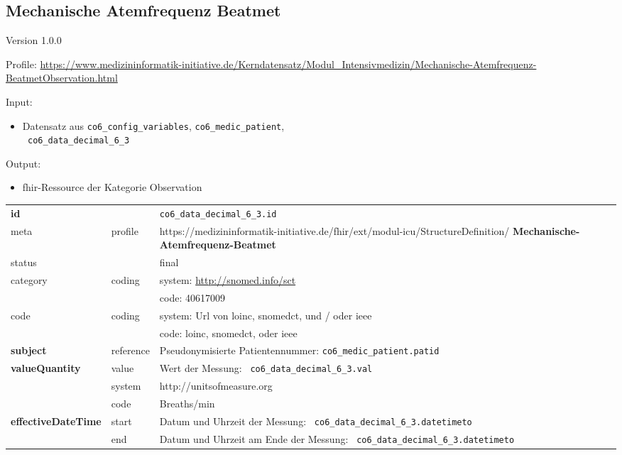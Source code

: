 \subsection{Mechanische Atemfrequenz Beatmet} 
\noindent Version 1.0.0

\noindent Profile: \url{https://www.medizininformatik-initiative.de/Kerndatensatz/Modul_Intensivmedizin/Mechanische-Atemfrequenz-BeatmetObservation.html}

\noindent Input:

\begin{itemize}
	\item Datensatz aus \texttt{co6\_config\_variables}, \texttt{co6\_medic\_patient}, \\ \texttt{
co6\_data\_decimal\_6\_3}
\end{itemize}
Output:
\begin{itemize}
        \item \ac{fhir}-Ressource der Kategorie \glqq Observation\grqq{}
\end{itemize}
\begin{longtable}{|l|l|p{7.5cm}|}
        \hline
        \rowcolor{lightgray} \multicolumn{3}{|l|}{Data Mapping (inhaltlich)} \\ \hline
        \textbf{id} &  & \texttt{co6\_data\_decimal\_6\_3.id} \\ \hline
	meta & profile & https://medizininformatik-initiative.de/fhir/ext/modul-icu/StructureDefinition/\textbf{
Mechanische-Atemfrequenz-Beatmet} \\ \hline 
	status &  & final   \\ \hline 
	category & coding & system: \url{http://snomed.info/sct} \\
\cline{3-3}
	& & code: 40617009 \\ \hline
	code & coding & system: Url von \ac{loinc}, \ac{snomedct}, und / oder \ac{ieee} \\ 
	\cline{3-3} 
	 &  & code: \ac{loinc}, \ac{snomedct}, oder \ac{ieee} \\ \hline
	 \textbf{subject}  & reference & Pseudonymisierte Patientennummer: \texttt{co6\_medic\_patient.patid} \\ \hline
	 \textbf{valueQuantity}  & value & Wert der Messung: \texttt{
co6\_data\_decimal\_6\_3.val} \\
        \cline{2-3}
         & system & http://unitsofmeasure.org \\
         \cline{2-3}
         & code & {Breaths}/min \\ \hline
     \textbf{effectiveDateTime}  & start & Datum und Uhrzeit der Messung: \texttt{
co6\_data\_decimal\_6\_3.datetimeto} \\
    \cline{2-3}
     & end & Datum und Uhrzeit am Ende der Messung: \texttt{
co6\_data\_decimal\_6\_3.datetimeto} \\ \hline
\end{longtable}



